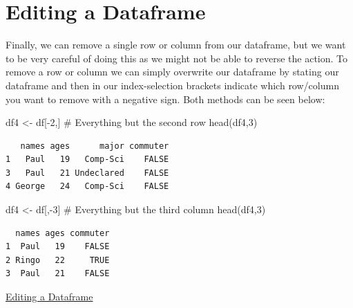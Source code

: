 \documentclass[
  letterpaper,
  DIV=11,
  numbers=noendperiod]{scrreprt}
\newenvironment{Shaded}{\begin{snugshade}}{\end{snugshade}}
\newcommand{\CommentTok}[1]{\textcolor[rgb]{0.37,0.37,0.37}{#1}}
\newcommand{\DecValTok}[1]{\textcolor[rgb]{0.68,0.00,0.00}{#1}}
\newcommand{\FunctionTok}[1]{\textcolor[rgb]{0.28,0.35,0.67}{#1}}
\newcommand{\NormalTok}[1]{\textcolor[rgb]{0.00,0.23,0.31}{#1}}
\newcommand{\OtherTok}[1]{\textcolor[rgb]{0.00,0.23,0.31}{#1}}
\newcommand{\SpecialCharTok}[1]{\textcolor[rgb]{0.37,0.37,0.37}{#1}}
\begin{document}
\section{Editing a Dataframe}\label{editing-a-dataframe}

Finally, we can remove a single row or column from our dataframe, but we
want to be very careful of doing this as we might not be able to reverse
the action. To remove a row or column we can simply overwrite our
dataframe by stating our dataframe and then in our index-selection
brackets indicate which row/column you want to remove with a negative
sign. Both methods can be seen below:

\begin{Shaded}
\begin{Highlighting}[]
\NormalTok{df4 }\OtherTok{\textless{}{-}}\NormalTok{ df[}\SpecialCharTok{{-}}\DecValTok{2}\NormalTok{,] }\CommentTok{\# Everything but the second row}
\FunctionTok{head}\NormalTok{(df4,}\DecValTok{3}\NormalTok{)}
\end{Highlighting}
\end{Shaded}

\begin{verbatim}
   names ages      major commuter
1   Paul   19   Comp-Sci    FALSE
3   Paul   21 Undeclared    FALSE
4 George   24   Comp-Sci    FALSE
\end{verbatim}

\begin{Shaded}
\begin{Highlighting}[]
\NormalTok{df4 }\OtherTok{\textless{}{-}}\NormalTok{ df[,}\SpecialCharTok{{-}}\DecValTok{3}\NormalTok{] }\CommentTok{\# Everything but the third column}
\FunctionTok{head}\NormalTok{(df4,}\DecValTok{3}\NormalTok{)}
\end{Highlighting}
\end{Shaded}

\begin{verbatim}
  names ages commuter
1  Paul   19    FALSE
2 Ringo   22     TRUE
3  Paul   21    FALSE
\end{verbatim}

\begin{watch}{}{}
    \href{https://youtu.be/us5M1ekgwUE}{Editing a Dataframe}
\end{watch}
\end{document}
